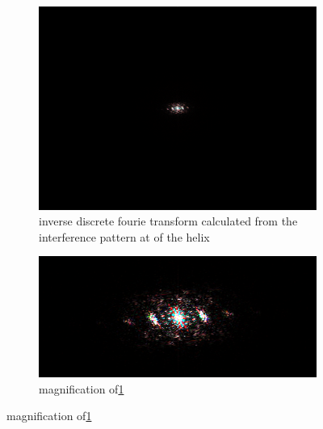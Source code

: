 \begin{figure}[H]
    \centering
    \begin{subfigure}{0.48\columnwidth}
        \centering
        \includegraphics[width=0.9\columnwidth]{figures/expantion fourie transform.png}
        \caption{inverse discrete fourie transform calculated from the interference pattern at of the helix }
        \label{fig:expansion inverse fourie transform measured}
    \end{subfigure}\hfill
    \begin{subfigure}{0.48\columnwidth}
        \centering
        \includegraphics[width=\columnwidth]{figures/expantion fourie transform magnified.png} %
        \caption{magnification of\ref{fig:expansion inverse fourie transform measured}}
        \label{fig:expansion fourie transform magnified}
    \end{subfigure}

    \label{fig:expansion theory measurements}
\end{figure}
